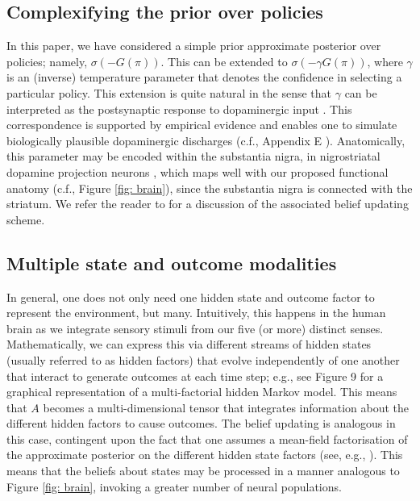 \documentclass[review,12pt,authoryear]{elsarticle}
\begin{document}
\subsection{Complexifying the prior over policies}
\label{appendix: gamma}

In this paper, we have considered a simple prior approximate posterior over policies; namely, $\sigma (-G(\pi))$. This can be extended to $\sigma (-\gamma G(\pi))$, where $\gamma$ is an (inverse) temperature parameter that denotes the confidence in selecting a particular policy. This extension is quite natural in the sense that $\gamma$ can be interpreted as the postsynaptic response to dopaminergic input \citep{fitzgeraldDopamineRewardLearning2015,fristonAnatomyChoiceDopamine2014}. This correspondence is supported by empirical evidence \citep{schwartenbeckDopaminergicMidbrainEncodes2015} and enables one to simulate biologically plausible dopaminergic discharges (c.f., Appendix E \citep{fristonActiveInferenceProcess2017}). Anatomically, this parameter may be encoded within the substantia nigra, in nigrostriatal dopamine projection neurons \citep{schwartenbeckDopaminergicMidbrainEncodes2015}, which maps well with our proposed functional anatomy (c.f., Figure \ref{fig: brain}), since the substantia nigra is connected with the striatum. We refer the reader to \citep{fristonActiveInferenceProcess2017} for a discussion of the associated belief updating scheme.

 
\subsection{Multiple state and outcome modalities}
\label{appendix: multiple state outcome}

In general, one does not only need one hidden state and outcome factor to represent the environment, but many. Intuitively, this happens in the human brain as we integrate sensory stimuli from our five (or more) distinct senses. Mathematically, we can express this via different streams of hidden states (usually referred to as hidden factors) that evolve independently of one another that interact to generate outcomes at each time step; e.g., see Figure 9 \citep{jordanIntroductionVariationalMethods1998} for a graphical representation of a multi-factorial hidden Markov model. This means that $A$ becomes a multi-dimensional tensor that integrates information about the different hidden factors to cause outcomes. The belief updating is analogous in this case, contingent upon the fact that one assumes a mean-field factorisation of the approximate posterior on the different hidden state factors (see, e.g., \citep{mirzaSceneConstructionVisual2016,fristonFunctionalAnatomyTime2016}). This means that the beliefs about states may be processed in a manner analogous to Figure \ref{fig: brain}, invoking a greater number of neural populations.
\end{document}
